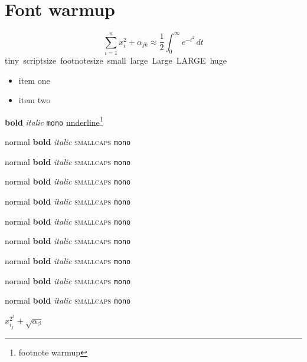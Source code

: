 \documentclass[11pt,a4paper]{article}
\begin{document}
\section{Font warmup}
\begin{equation}\label{eq:warm}
  \sum_{i=1}^{n} x_i^{2} + \alpha_{jk} \approx \frac{1}{2}\int_0^\infty e^{-t^2}\,dt
\end{equation}
{\tiny tiny}\ {\scriptsize scriptsize}\ {\footnotesize footnotesize}\ {\small small}\
{\large large}\ {\Large Large}\ {\LARGE LARGE}\ {\huge huge}
\begin{itemize}\item item one\item item two\end{itemize}
\textbf{bold} \textit{italic} \texttt{mono} \underline{underline}\footnote{footnote warmup}


{\tiny normal} {\tiny \textbf{bold}} {\tiny \textit{italic}} {\tiny \textsc{smallcaps}} {\tiny \texttt{mono}}

{\scriptsize normal} {\scriptsize \textbf{bold}} {\scriptsize \textit{italic}} {\scriptsize \textsc{smallcaps}} {\scriptsize \texttt{mono}}

{\footnotesize normal} {\footnotesize \textbf{bold}} {\footnotesize \textit{italic}} {\footnotesize \textsc{smallcaps}} {\footnotesize \texttt{mono}}

{\small normal} {\small \textbf{bold}} {\small \textit{italic}} {\small \textsc{smallcaps}} {\small \texttt{mono}}

{\normalsize normal} {\normalsize \textbf{bold}} {\normalsize \textit{italic}} {\normalsize \textsc{smallcaps}} {\normalsize \texttt{mono}}

{\large normal} {\large \textbf{bold}} {\large \textit{italic}} {\large \textsc{smallcaps}} {\large \texttt{mono}}

{\Large normal} {\Large \textbf{bold}} {\Large \textit{italic}} {\Large \textsc{smallcaps}} {\Large \texttt{mono}}

{\LARGE normal} {\LARGE \textbf{bold}} {\LARGE \textit{italic}} {\LARGE \textsc{smallcaps}} {\LARGE \texttt{mono}}

{\huge normal} {\huge \textbf{bold}} {\huge \textit{italic}} {\huge \textsc{smallcaps}} {\huge \texttt{mono}}

$x_{i_{j}}^{2^{3}} + \sqrt{\alpha_\beta}$



\end{document}
